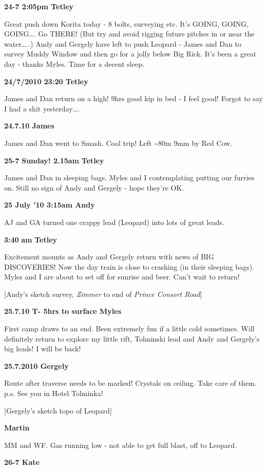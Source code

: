 \textbf{24-7 2:05pm Tetley}

Great push down Korita today - 8 bolts, surveying etc. It's GOING,
GOING, GOING\ldots{}. Go THERE! (But try and avoid rigging future
pitches in or near the water\ldots{}..) Andy and Gergely have left to
push Leopard - James and Dan to survey Muddy Window and then go for a
jolly below Big Rick. It's been a great day - thanks Myles. Time for a
decent sleep.

\textbf{24/7/2010 23:20 Tetley}

James and Dan return on a high! 9hrs good kip in bed - I feel good!
Forgot to say I had a shit yesterday\ldots{}.

\textbf{24.7.10 James}

James and Dan went to Smash. Cool trip! Left \textasciitilde{}80m 9mm by
Red Cow.

\textbf{25-7} \textbf{Sunday! 2.15am} \textbf{Tetley}

James and Dan in sleeping bags. Myles and I contemplating putting our
furries on. Still no sign of Andy and Gergely - hope they're OK.

\textbf{25 July '10 3:15am Andy}

AJ and GA turned one crappy lead (Leopard) into lots of great leads.

\textbf{3:40} \textbf{am} \textbf{Tetley}

Excitement mounts as Andy and Gergely return with news of BIG
DISCOVERIES! Now the day train is close to crashing (in their sleeping
bags). Myles and I are about to set off for sunrise and beer. Can't wait
to return!

{[}Andy's sketch survey, \emph{Zimmer} to end of \emph{Prince Consort
Road}{]}

\textbf{25.7.10 T- 5hrs to surface Myles}

First camp draws to an end. Been extremely fun if a little cold
sometimes. Will definitely return to explore my little rift, Tolminski
lead and Andy and Gergely's big leads! I will be back!

\textbf{25.7.2010 Gergely}

Route after traverse needs to be marked! Crystals on ceiling. Take care
of them. p.s. See you in Hotel Tolminka!

{[}Gergely's sketch topo of Leopard{]}

\textbf{Martin}

MM and WF. Gas running low - not able to get full blast, off to Leopard.

\textbf{26-7 Kate}

